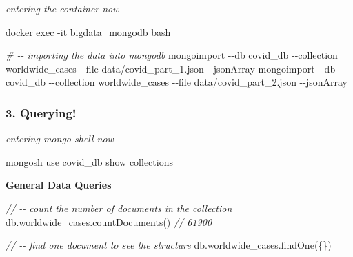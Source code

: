 \documentclass[
]{article}
\newenvironment{Shaded}{}{}
\newcommand{\AttributeTok}[1]{\textcolor[rgb]{0.49,0.56,0.16}{#1}}
\newcommand{\CommentTok}[1]{\textcolor[rgb]{0.38,0.63,0.69}{\textit{#1}}}
\newcommand{\ExtensionTok}[1]{#1}
\newcommand{\FunctionTok}[1]{\textcolor[rgb]{0.02,0.16,0.49}{#1}}
\newcommand{\NormalTok}[1]{#1}
\newcommand{\OperatorTok}[1]{\textcolor[rgb]{0.40,0.40,0.40}{#1}}
\begin{document}
\emph{entering the container now}

\begin{Shaded}
\begin{Highlighting}[]
\ExtensionTok{docker}\NormalTok{ exec }\AttributeTok{{-}it}\NormalTok{ bigdata\_mongodb bash}

\CommentTok{\# {-}{-} importing the data into mongodb}
\ExtensionTok{mongoimport} \AttributeTok{{-}{-}db}\NormalTok{ covid\_db }\AttributeTok{{-}{-}collection}\NormalTok{ worldwide\_cases }\AttributeTok{{-}{-}file}\NormalTok{ data/covid\_part\_1.json }\AttributeTok{{-}{-}jsonArray}
\ExtensionTok{mongoimport} \AttributeTok{{-}{-}db}\NormalTok{ covid\_db }\AttributeTok{{-}{-}collection}\NormalTok{ worldwide\_cases }\AttributeTok{{-}{-}file}\NormalTok{ data/covid\_part\_2.json }\AttributeTok{{-}{-}jsonArray}
\end{Highlighting}
\end{Shaded}

\hypertarget{querying}{%
\subsubsection{3. Querying!}\label{querying}}

\emph{entering mongo shell now}

\begin{Shaded}
\begin{Highlighting}[]
\ExtensionTok{mongosh}
\ExtensionTok{use}\NormalTok{ covid\_db}
\ExtensionTok{show}\NormalTok{ collections}
\end{Highlighting}
\end{Shaded}

\textbf{General Data Queries}

\begin{Shaded}
\begin{Highlighting}[]
\CommentTok{// {-}{-} count the number of documents in the collection}
\NormalTok{db}\OperatorTok{.}\AttributeTok{worldwide\_cases}\OperatorTok{.}\FunctionTok{countDocuments}\NormalTok{()}
\CommentTok{// 61900}

\CommentTok{// {-}{-} find one document to see the structure}
\NormalTok{db}\OperatorTok{.}\AttributeTok{worldwide\_cases}\OperatorTok{.}\FunctionTok{findOne}\NormalTok{(\{\})}
\end{Highlighting}
\end{Shaded}
\end{document}
